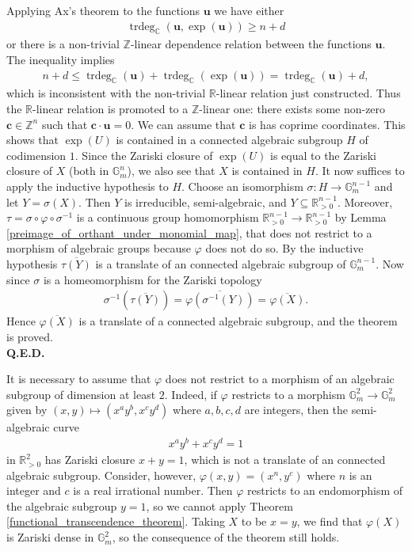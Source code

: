 \documentclass[9pt]{amsart}
\theoremstyle{my_theorem_style}
\numberwithin{definition}{section}
\renewenvironment{proof}{\noindent {\textbf{Proof.}}}{\\\textbf{Q.E.D.}}
\newcommand{\C}{\mathbb{C}}
\newcommand{\G}{\mathbb{G}}
\renewcommand{\phi}{\varphi}
\newcommand{\R}{\mathbb{R}}
\DeclareMathOperator{\trdeg}{trdeg}
\renewcommand{\vec}[1]{\bm{#1}}
\newcommand{\Z}{\mathbb{Z}}
\begin{document}
\begin{proof}
    Applying Ax's theorem \cite[Theorem 3]{Ax_on_Schanuel's_conjectures} to the functions $\vec{u}$ we have either
    \begin{align*}
        \trdeg_\C(\vec{u}, \exp(\vec{u})) \geq n + d
    \end{align*}
    or there is a non-trivial $\Z$-linear dependence relation between the functions $\vec{u}$. The inequality implies
    \begin{align*}
        n + d \leq \trdeg_\C(\vec{u}) + \trdeg_\C(\exp(\vec{u})) = 
        \trdeg_\C(\vec{u}) + d,
    \end{align*}
    which is inconsistent with the non-trivial $\R$-linear relation just constructed. Thus the $\R$-linear relation is promoted to a $\Z$-linear one: there exists some non-zero $\vec{c} \in \Z^n$ such that $\vec{c} \cdot \vec{u} = 0$. We can assume that $\vec{c}$ is has coprime coordinates. This shows that $\exp(U)$ is contained in a connected algebraic subgroup $H$ of codimension $1$. Since the Zariski closure of $\exp(U)$ is equal to the Zariski closure of $X$ (both in $\G_m^n$), we also see that $X$ is contained in $H$. It now suffices to apply the inductive hypothesis to $H$. Choose an isomorphism $\sigma : H \to \G_m^{n - 1}$ and let $Y = \sigma(X)$. Then $Y$ is irreducible, semi-algebraic, and $Y \subseteq \R_{>0}^{n - 1}$. Moreover, $\tau = \sigma \circ \phi \circ \sigma^{-1}$ is a continuous group homomorphism $\R_{>0}^{n - 1} \to \R_{>0}^{n - 1}$ by Lemma \ref{preimage_of_orthant_under_monomial_map}, that does not restrict to a morphism of algebraic groups because $\phi$ does not do so. By the inductive hypothesis $\overline{\tau(Y)}$ is a translate of an connected algebraic subgroup of $\G_m^{n - 1}$. Now since $\sigma$ is a homeomorphism for the Zariski topology
    \begin{align*}
        \sigma^{-1}(\overline{\tau(Y)}) =
        \overline{\phi(\sigma^{-1}(Y))} = \overline{\phi(X)}.
    \end{align*}
    Hence $\overline{\phi(X)}$ is a translate of a connected algebraic subgroup, and the theorem is proved.
\end{proof}

It is necessary to assume that $\phi$ does not restrict to a morphism of an algebraic subgroup of dimension at least $2$. Indeed, if $\phi$ restricts to a morphism $\G_m^2 \to \G_m^2$ given by $(x, y) \mapsto (x^a y^b, x^c y^d)$ where $a, b, c, d$ are integers, then the semi-algebraic curve
\begin{align*}
    x^a y^b + x^c y^d = 1
\end{align*}
in $\R_{>0}^2$ has Zariski closure $x + y = 1$, which is not a translate of an connected algebraic subgroup. Consider, however, $\phi(x, y) = (x^n, y^c)$ where $n$ is an integer and $c$ is a real irrational number. Then $\phi$ restricts to an endomorphism of the algebraic subgroup $y = 1$, so we cannot apply Theorem \ref{functional_transcendence_theorem}. Taking $X$ to be $x = y$, we find that $\phi(X)$ is Zariski dense in $\G_m^2$, so the consequence of the theorem still holds.
\end{document}

